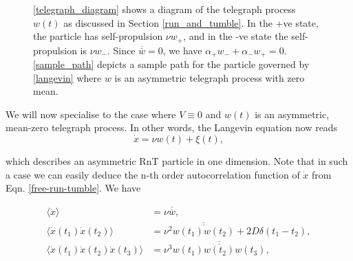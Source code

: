 \documentclass[%
 amsmath,amssymb,
]{revtex4-2}
\newcommand{\Overline}[1]{\overline{\overline{#1}}}
\begin{document}
\begin{figure}[h]
\centering
{}
\hfill
{}
\caption{\ref{telegraph_diagram} shows a diagram of the telegraph process $w(t)$ as discussed in Section \ref{run_and_tumble}. In the +ve state, the particle has self-propulsion $\nu w_+$, and in the -ve state the self-propulsion is $\nu w_-$. Since $\Overline{w} = 0$, we have $\alpha_+w_- + \alpha_-w_+ = 0$. \ref{sample_path} depicts a sample path for the particle governed by \ref{langevin} where $w$ is an asymmetric telegraph process with zero mean.}
\label{figure1}
\end{figure}

We will now specialise to the case where $V \equiv 0$ and $w(t)$ is an asymmetric, mean-zero telegraph process. In other words, the Langevin equation now reads
\begin{equation}\label{free-run-tumble}
  \dot{x} = \nu w(t) + \xi(t),
\end{equation}

which describes an asymmetric RnT particle in one dimension. Note that in such a case we can easily deduce the n-th order autocorrelation function of $\dot{x}$ from Eqn. \ref{free-run-tumble}. We have

\begin{align}
    \langle \dot{x}\rangle &= \nu \Overline{w},\\
    \langle \dot{x}(t_1)\dot{x}(t_2) \rangle &= \nu^2 \Overline{w(t_1)w(t_2)} + 2D\delta(t_1-t_2), \\
    \langle \dot{x}(t_1)\dot{x}(t_2)\dot{x}(t_3) \rangle &= \nu^3 \Overline{w(t_1)w(t_2)w(t_3)},
\end{align}
\end{document}
